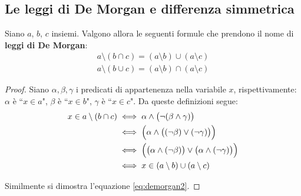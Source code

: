 \subsection{Le leggi di De Morgan e differenza simmetrica}
\begin{teorbox}
	Siano $a$, $b$, $c$ insiemi. Valgono allora le seguenti formule che prendono il nome di \textbf{leggi di De Morgan}:
	\begin{eqnarray}
		a \setminus (b \cap c) = (a \setminus b ) \cup (a \setminus c) \\
		a \setminus (b \cup c) = (a \setminus b) \cap (a \setminus c) \label{eq:demorgan2}
	\end{eqnarray}
\end{teorbox}

\begin{proof}
	Siano $\alpha,\beta,\gamma$ i predicati di appartenenza nella variabile $x$, rispettivamente: $\alpha$ è ``$x \in a$", $\beta$ è ``$x \in b$", $\gamma$ è ``$x \in c$". Da queste definizioni segue:
	\begin{align*}
		x \in a \setminus (b \cap c) &\iff \alpha \land \bigl(\neg (\beta \land \gamma)\bigr)  \\
		&\iff  \Bigl(\alpha \land \bigl((\neg \beta) \lor (\neg \gamma)\bigr)\Bigr)  \\
		&\iff  \Bigl(\bigl(\alpha \land (\neg \beta)\bigr) \lor \bigl(\alpha \land (\neg \gamma)\bigr)\Bigr)  \\
		&\iff  x \in (a \setminus b) \cup (a \setminus c)
	\end{align*}
	
	Similmente si dimostra l'equazione \ref{eq:demorgan2}.
\end{proof}




